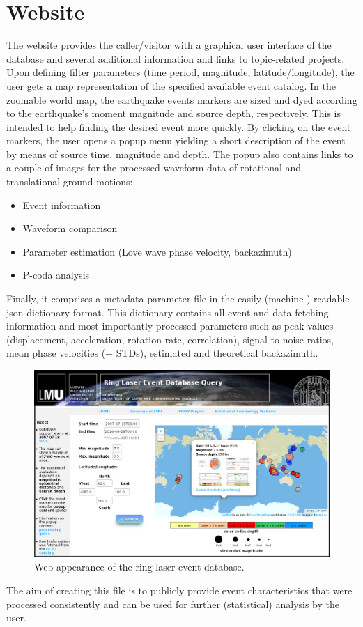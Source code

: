 \documentclass[12pt,reqno]{article} %
\begin{document}
\section{Website}
\label{sec:website}

The website provides the caller/visitor with a graphical user interface of the database and several additional information and links to topic-related projects.
Upon defining filter parameters (time period, magnitude, latitude/longitude), the user gets a map representation of the specified available event catalog.  In the zoomable world map, the earthquake events markers are sized and dyed according to the earthquake’s moment magnitude and source depth, respectively. This is intended to help finding the desired event more quickly.
By clicking on the event markers, the user opens a popup menu yielding a short description of the event by means of source time, magnitude and depth. The popup also contains links to a couple of images for the processed waveform data of rotational and translational ground motions:

\begin{itemize}
	\item Event information
	\item Waveform comparison
	\item Parameter estimation (Love wave phase velocity, backazimuth)
	\item P-coda analysis
\end{itemize}

Finally, it comprises a metadata parameter file in the easily (machine-) readable json-dictionary format. This dictionary contains all event and data fetching information and most importantly processed parameters such as  peak values (displacement, acceleration, rotation rate, correlation), signal-to-noise ratios, mean phase velocities (+ STDs), estimated and theoretical backazimuth.
\begin{figure}[!htp]
\centering
\includegraphics[width=\textwidth]{webpage_framed.png}
\caption{Web appearance of the ring laser event database.}
\label{fig:stretchmar}
\end{figure}
The aim of creating this file is to publicly provide event characteristics that were processed consistently and can be used for further (statistical) analysis by the user.
\end{document}
